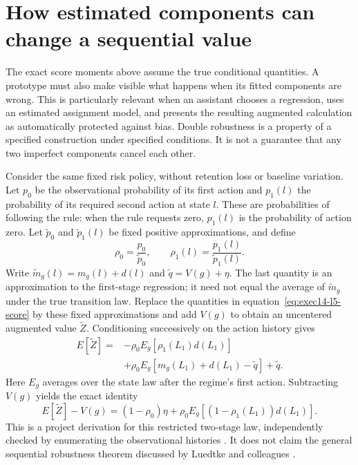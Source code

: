 \section{How estimated components can change a sequential value}
\label{exec14:l5-remainder}

The exact score moments above assume the true conditional quantities. A
prototype must also make visible what happens when its fitted components are
wrong. This is particularly relevant when an assistant chooses a regression,
uses an estimated assignment model, and presents the resulting augmented
calculation as automatically protected against bias. Double robustness is a
property of a specified construction under specified conditions. It is not a
guarantee that any two imperfect components cancel each other.

Consider the same fixed risk policy, without retention loss or baseline
variation. Let $p_0$ be the observational probability of its first action and
$p_1(l)$ the probability of its required second action at state $l$. These are
probabilities of following the rule: when the rule requests zero, $p_1(l)$ is
the probability of action zero. Let $\widetilde p_0$ and
$\widetilde p_1(l)$ be fixed positive approximations, and define
\[
 \rho_0=\frac{p_0}{\widetilde p_0},\qquad
 \rho_1(l)=\frac{p_1(l)}{\widetilde p_1(l)}.
\]
Write $\widetilde m_g(l)=m_g(l)+d(l)$ and
$\widetilde q=V(g)+\eta$. The last quantity is an approximation to the
first-stage regression; it need not equal the average of
$\widetilde m_g$ under the true transition law. Replace the quantities in
equation~\eqref{eq:exec14-l5-score} by these fixed approximations and add
$V(g)$ to obtain an uncentered augmented value $\widetilde Z$. Conditioning
successively on the action history gives
\begin{align*}
 E[\widetilde Z]
 ={}&-\rho_0E_g[\rho_1(L_1)d(L_1)]\\
 &+\rho_0E_g[m_g(L_1)+d(L_1)-\widetilde q]
   +\widetilde q.
\end{align*}
Here $E_g$ averages over the state law after the regime's first action.
Subtracting $V(g)$ yields the exact identity
\begin{equation}
 E[\widetilde Z]-V(g)
 =(1-\rho_0)\eta
   +\rho_0E_g[(1-\rho_1(L_1))d(L_1)].
 \label{eq:exec14-l5-remainder}
\end{equation}
This is a project derivation for this restricted two-stage law, independently
checked by enumerating the observational histories
\citep{exec14_workflow_remainder}. It does not claim the general sequential
robustness theorem discussed by Luedtke and colleagues
\citep{sequentialdr2018}.

